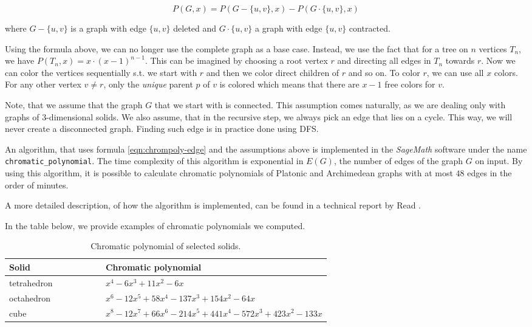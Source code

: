 \begin{equation}\label{eqn:chrompoly-edge}
    P(G,x) = P(G - \{u,v\},x) - P(G \cdot \{u,v\},x)
\end{equation}

where $G - \{u,v\}$ is a graph with edge $\{u,v\}$ deleted and $G \cdot \{u,v\}$ a graph with edge $\{u,v\}$ contracted. 

Using the formula above, we can no longer use the complete graph as a base case. Instead, we use the fact that for a tree on $n$ vertices $T_n$, we have $P(T_n,x) = x \cdot (x-1)^{n-1}$. This can be imagined by choosing a root vertex $r$ and directing all edges in $T_n$ towards $r$. Now we can color the vertices sequentially s.t. we start with $r$ and then we color direct children of $r$ and so on. To color $r$, we can use all $x$ colors. For any other vertex $v \neq r$, only the \textit{unique} parent $p$ of $v$ is colored which means that there are $x-1$ free colors for $v$. 

Note, that we assume that the graph $G$ that we start with is connected. This assumption comes naturally, as we are dealing only with graphs of 3-dimensional solids. We also assume, that in the recursive step, we always pick an edge that lies on a cycle. This way, we will never create a disconnected graph. Finding such edge is in practice done using DFS.

An algorithm, that uses formula \ref{eqn:chrompoly-edge} and the assumptions above is implemented in the \textit{SageMath} \cite{sagemath} software under the name \verb|chromatic_polynomial|. The time complexity of this algorithm is exponential in $E(G)$, the number of edges of the graph $G$ on input. By using this algorithm, it is possible to calculate chromatic polynomials of Platonic and Archimedean graphs with at most $48$ edges in the order of minutes.

A more detailed description, of how the algorithm is implemented, can be found in a technical report by Read \cite{read1987chromatic}.

In the table below, we provide examples of chromatic polynomials we computed.

\begin{table}[H]
\centering
\begin{tabular}{lp{0.7\linewidth}}
\toprule
\textbf{Solid} & \textbf{Chromatic polynomial} \\
\midrule
tetrahedron & $x^{4} - 6x^{3} + 11x^{2} - 6x$ \\
octahedron & $x^{6} - 12x^{5} + 58x^{4} - 137x^{3} + 154x^{2} - 64x$ \\
cube & $x^{8} - 12x^{7} + 66x^{6} - 214x^{5} + 441x^{4} - 572x^{3} + 423x^{2} - 133x$ \\
\bottomrule
\end{tabular}
\caption{Chromatic polynomial of selected solids.}
\label{tab:selected-chrom-polys}
\end{table}

